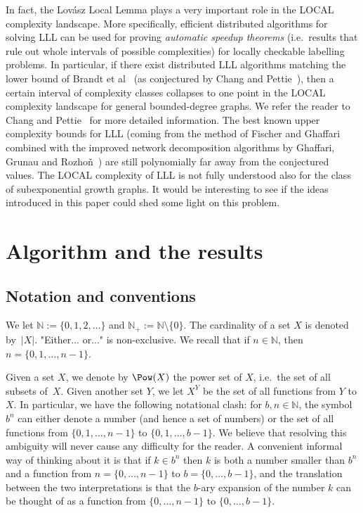 \documentclass[12pt,a4paper]{article}
\numberwithin{equation}{section}
\theoremstyle{definition}
\newcommand\NN{\mathbb N}
\begin{document}
    In fact, the Lov\'asz Local Lemma plays a very important role in the {\sf LOCAL} complexity landscape. 
    More specifically,  efficient distributed algorithms for solving LLL can be used for proving \emph{automatic speedup theorems} (i.e.~results that rule out whole intervals of possible complexities) for locally checkable labelling problems. In particular, if there exist distributed LLL algorithms matching the lower bound of Brandt et al~\cite{BFHKLRSU16} (as conjectured by Chang and Pettie~\cite[Conjecture~5.1]{ChangPettie19siamjc}), then a certain interval of complexity classes collapses to one point in the {\sf LOCAL} complexity landscape for general bounded-degree graphs. 
    We refer the reader to Chang and Pettie~\cite{ChangPettie19siamjc} for more detailed information.
    The best known upper complexity bounds for LLL (coming from the method of Fischer and Ghaffari~\cite{FischerGhaffari17} combined with the improved network decomposition algorithms by Ghaffari, Grunau and Rozho\v n~\cite{RozhonGhaffari20,GhaffariGrunauRozhon21}) are still polynomially far away from the conjectured values. The {\sf LOCAL} complexity of LLL is not fully understood also for the class of subexponential growth graphs. 
    It would be interesting to see if the ideas introduced in this paper could shed some light on this problem. 
    
    
    \section{Algorithm and the results}\label{mtal}
    
    \subsection{Notation and conventions}
    We let  $\NN :=  \{0,1,2,\ldots\}$ and $\NN_+:=\NN\setminus \{0\}$. The cardinality of a set $X$ 
    is denoted by~$|X|$.   "Either... or..." is non-exclusive.   We recall that if $n\in \NN$, then $n=\{0,1,\ldots,n-1\}$. 
    
    Given a set $X$, we denote by $\Pow(X)$  the power set of $X$, i.e.~the set of all subsets of~$X$. Given another set $Y$, we let $X^Y$ be the set of all functions from $Y$ to $X$.  In particular, we have the following notational clash: for $b,n\in \NN$, the symbol $b^n$ can either denote a number (and hence a set of numbers)  or the set of all functions from $\{0,1,\ldots, n-1\}$ to $\{0,1,\ldots, b-1\}$. We believe that resolving this ambiguity will never cause any difficulty for the reader. A convenient informal way of thinking about it is that if $k\in b^n$ then $k$ is both a number smaller than $b^n$ and a function from $n=\{0,\ldots, n-1\}$ to $b=\{0,\ldots, b-1\}$, and the translation between the two interpretations is that the $b$-ary expansion of the number $k$ can be thought of as a function from $\{0,\ldots, n-1\}$ to $\{0,\ldots, b-1\}$.
    
\end{document}
